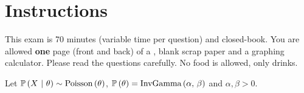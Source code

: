 \documentclass[12pt,landscape]{article}
\begin{document}
\section*{Instructions}
This exam is 70 minutes (variable time per question) and closed-book. You are allowed \textbf{one} page (front and back) of a , blank scrap paper and a graphing calculator. Please read the questions carefully. No food is allowed, only drinks. %

\pagebreak



\problem{} Let $\mathbb{P}\left(X~|~\theta\right) \sim \mathrm{Poisson}\left(\theta\right)$, $\mathbb{P}\left(\theta\right) =\text{InvGamma}\left(\alpha,\,\beta\right)$ and $\alpha, \beta > 0$.

\vspace{-0.2cm}\benum{} 
\end{document}
